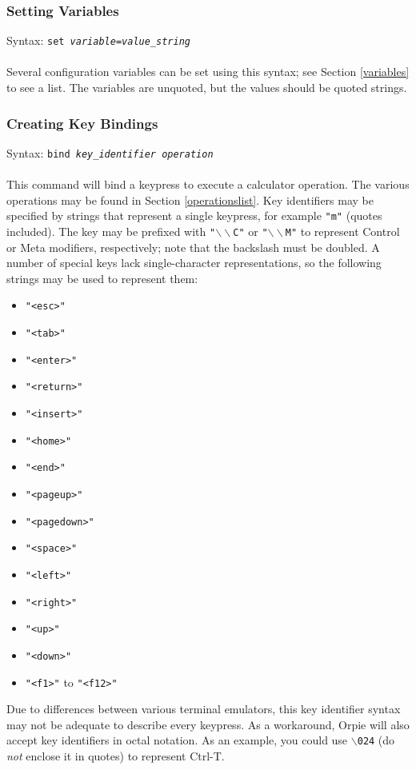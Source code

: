 \documentclass[11pt,notitlepage]{article}
\begin{document}
\subsubsection{Setting Variables}
\label{setvar}
Syntax: {\tt set {\em variable}={\em value\_string}} \\ \\
Several configuration variables can be set using this syntax; see Section \ref{variables}
to see a list.  The variables are unquoted, but the values should be quoted strings.

\subsubsection{Creating Key Bindings}
\label{bindings}
Syntax: {\tt bind {\em key\_identifier operation}} \\ \\
This command will bind a keypress to execute a calculator operation.  The various operations
may be found in Section \ref{operationslist}. Key identifiers may be specified
by strings that represent a single keypress, for example {\tt "m"} (quotes
included).  The key may be prefixed with {\tt "$\backslash\backslash$C"} or
{\tt "$\backslash\backslash$M"} to represent Control or Meta modifiers,
respectively; note that the backslash must be doubled.  A number of special
keys lack single-character representations, so the following strings may be
used to represent them:
\begin{itemize}
   \item {\tt "<esc>"}
   \item {\tt "<tab>"}
   \item {\tt "<enter>"}
   \item {\tt "<return>"}
   \item {\tt "<insert>"}
   \item {\tt "<home>"}
   \item {\tt "<end>"}
   \item {\tt "<pageup>"}
   \item {\tt "<pagedown>"}
   \item {\tt "<space>"}
   \item {\tt "<left>"}
   \item {\tt "<right>"}
   \item {\tt "<up>"}
   \item {\tt "<down>"}
   \item {\tt "<f1>"} to {\tt "<f12>"}
\end{itemize}
Due to differences between various terminal emulators, this key identifier syntax may
not be adequate to describe every keypress.  As a workaround, Orpie will also accept key
identifiers in octal notation.  As an example, you could use {\tt $\backslash$024} 
(do {\em not} enclose it in quotes) to represent Ctrl-T.
\end{document}
